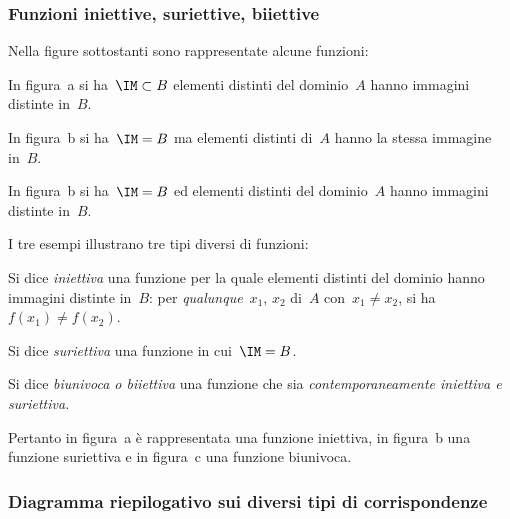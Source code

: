 
\subsubsection{Funzioni iniettive, suriettive, biiettive}

\begin{exrig}
 \begin{esempio}
Nella figure sottostanti sono rappresentate alcune funzioni:
\begin{center}
 
\end{center}

In figura~a si ha~$\IM\subset B$ elementi distinti del dominio~$A$ hanno 
immagini distinte in~$B$.

In figura~b si ha~$\IM=B$ ma elementi distinti di~$A$ hanno la stessa immagine 
in~$B$.

In figura~b si ha~$\IM=B$ ed elementi distinti del dominio~$A$ hanno immagini 
distinte in~$B$.
 \end{esempio}
\end{exrig}

I tre esempi illustrano tre tipi diversi di funzioni:

\begin{definizione}
Si dice \emph{iniettiva} una funzione per la quale elementi distinti del
dominio hanno immagini distinte in~$B$: per \emph{qualunque}~$x_1$, $x_2$ di~$A$
con~$x_1\neq x_2$, si ha~$f(x_1)\neq f(x_2)$.
\end{definizione}

\begin{definizione}
Si dice \emph{suriettiva} una funzione in cui~$\IM = B$.
\end{definizione}

\begin{definizione}
Si dice \emph{biunivoca o biiettiva} una funzione che sia
\emph{contemporaneamente iniettiva e suriettiva.}
\end{definizione}

Pertanto in figura~a è rappresentata una funzione iniettiva, in figura~b una
funzione suriettiva e in figura~c una funzione biunivoca.

\subsubsection{Diagramma riepilogativo sui diversi tipi di corrispondenze}

